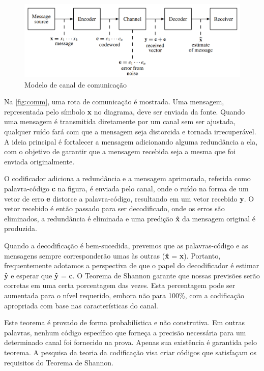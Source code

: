 \documentclass[
	12pt,				%
	openright,			%
	twoside,			%
	a4paper,			%
	english,			%
	french,				%
	spanish,			%
	brazil				%
	]{abntex2}
\begin{document}
\begin{figure}[H]
	\caption{\label{fig:comm}Modelo de canal de comunicação}
	\begin{center}
	    \includegraphics[scale=0.47]{img/Comm.png}
	\end{center}
\end{figure}

Na \autoref{fig:comm}, uma rota de comunicação é mostrada. Uma mensagem, representada pelo símbolo \textbf{x} no diagrama, deve ser enviada da fonte. Quando uma mensagem é transmitida diretamente por um canal sem ser ajustada, qualquer ruído fará com que a mensagem seja distorcida e tornada irrecuperável. A ideia principal é fortalecer a mensagem adicionando alguma redundância a ela, com o objetivo de garantir que a mensagem recebida seja a mesma que foi enviada originalmente.

O codificador adiciona a redundância e a mensagem aprimorada, referida como palavra-código \textbf{c} na figura, é enviada pelo canal, onde o ruído na forma de um vetor de erro \textbf{e} distorce a palavra-código, resultando em um vetor recebido \textbf{y}. O vetor recebido é então passado para ser decodificado, onde os erros são eliminados, a redundância é eliminada e uma predição \textbf{\^{x}} da mensagem original é produzida.

Quando a decodificação é bem-sucedida, prevemos que as palavras-código e as mensagens sempre corresponderão umas às outras (\textbf{\^{x}} = \textbf{x}). Portanto, frequentemente adotamos a perspectiva de que o papel do decodificador é estimar \textbf{\^{y}} e esperar que \textbf{\^{y}} = \textbf{c}. O Teorema de Shannon garante que nossas previsões serão corretas em uma certa porcentagem das vezes. Esta percentagem pode ser aumentada para o nível requerido, embora não para 100\%, com a codificação apropriada com base nas características do canal.

Este teorema é provado de forma probabilística e não construtiva. Em outras palavras, nenhum código específico que forneça a precisão necessária para um determinado canal foi fornecido na prova. Apenas sua existência é garantida pelo teorema. A pesquisa da teoria da codificação visa criar códigos que satisfaçam os requisitos do Teorema de Shannon.
\end{document}

